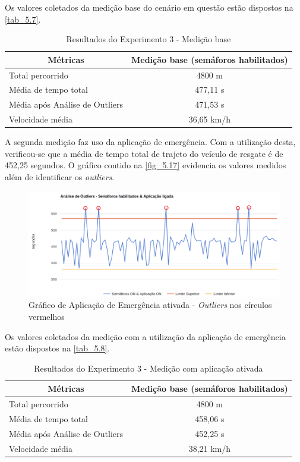 \documentclass[
12pt,				%
openright,			%
oneside,			%
a4paper,			%
brazil,				%
]{abntex2}
\begin{document}
	Os valores coletados da medição base do cenário em questão estão dispostos na \autoref{tab_5.7}.
	
	\begin{table}[H]
		\centering
		\renewcommand{\arraystretch}{1.5}
		\begin{tabular}{|l|c|}
			\hline
			\multicolumn{1}{|c|}{\textbf{Métricas}} & \textbf{Medição base (semáforos habilitados)} \\ \hline
			Total percorrido & 4800 m \\ \hline
			Média de tempo total & 477,11 s \\ \hline
			Média após Análise de Outliers & 471,53 s \\ \hline
			Velocidade média & 36,65 km/h \\ \hline
		\end{tabular}
		\caption{Resultados do Experimento 3 - Medição base}
		\label{tab_5.7}
	\end{table}
	
	\par A segunda medição faz uso da aplicação de emergência. Com a utilização desta, verificou-se que a média de tempo total de trajeto do veículo de resgate é de 452,25 segundos. O gráfico contido na \autoref{fig_5.17} evidencia os valores medidos além de identificar os \textit{outliers}.
	
	\begin{figure} [H]
		\centering
		\includegraphics[scale=.4]{figuras/cap5/517Grafico2}
		\caption{\label{fig_5.17}Gráfico de Aplicação de Emergência ativada - \textit{Outliers} nos círculos vermelhos}
	\end{figure}
	
	Os valores coletados da medição com a utilização da aplicação de emergência estão dispostos na \autoref{tab_5.8}.
	
	\begin{table}[H]
		\centering
		\renewcommand{\arraystretch}{1.5}
		\begin{tabular}{|l|c|}
			\hline
			\multicolumn{1}{|c|}{\textbf{Métricas}} & \textbf{Medição base (semáforos habilitados)} \\ \hline
			Total percorrido & 4800 m \\ \hline
			Média de tempo total & 458,06 s \\ \hline
			Média após Análise de Outliers & 452,25 s \\ \hline
			Velocidade média & 38,21 km/h \\ \hline
		\end{tabular}
		\caption{Resultados do Experimento 3 - Medição com aplicação ativada}
		\label{tab_5.8}
	\end{table}
	
\end{document}
